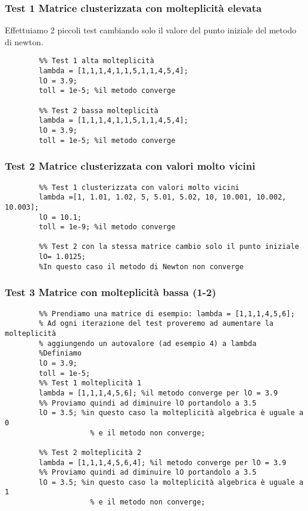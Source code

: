 \documentclass[12pt]{article}
\begin{document}
    \subsubsection{Test 1 Matrice clusterizzata con molteplicità elevata}
    Effettuiamo 2 piccoli test cambiando solo il valore del punto iniziale del metodo di newton.
    \begin{verbatim}
        %% Test 1 alta molteplicità 
        lambda = [1,1,1,4,1,1,5,1,1,4,5,4];
        lO = 3.9;
        toll = 1e-5; %il metodo converge

        %% Test 2 bassa molteplicità
        lambda = [1,1,1,4,1,1,5,1,1,4,5,4];
        lO = 3.9;
        toll = 1e-5; %il metodo converge
    \end{verbatim}
    \subsubsection{Test 2 Matrice clusterizzata con valori molto vicini}
    \begin{verbatim}
        %% Test 1 clusterizzata con valori molto vicini
        lambda =[1, 1.01, 1.02, 5, 5.01, 5.02, 10, 10.001, 10.002, 10.003];
        lO = 10.1;
        toll = 1e-9; %il metodo converge

        %% Test 2 con la stessa matrice cambio solo il punto iniziale
        lO= 1.0125;
        %In questo caso il metodo di Newton non converge
    \end{verbatim}
    \subsubsection{Test 3 Matrice con molteplicità bassa (1-2)}
    \begin{verbatim}
        %% Prendiamo una matrice di esempio: lambda = [1,1,1,4,5,6];
        % Ad ogni iterazione del test proveremo ad aumentare la molteplicità
        % aggiungendo un autovalore (ad esempio 4) a lambda
        %Definiamo
        lO = 3.9;
        toll = 1e-5;
        %% Test 1 molteplicità 1
        lambda = [1,1,1,4,5,6]; %il metodo converge per lO = 3.9
        %% Proviamo quindi ad diminuire lO portandolo a 3.5
        lO = 3.5; %in questo caso la molteplicità algebrica è uguale a 0
                    % e il metodo non converge;

        %% Test 2 molteplicità 2
        lambda = [1,1,1,4,5,6,4]; %il metodo converge per lO = 3.9
        %% Proviamo quindi ad diminuire lO portandolo a 3.5
        lO = 3.5; %in questo caso la molteplicità algebrica è uguale a 1
                    % e il metodo non converge;
    \end{verbatim}
\end{document}
